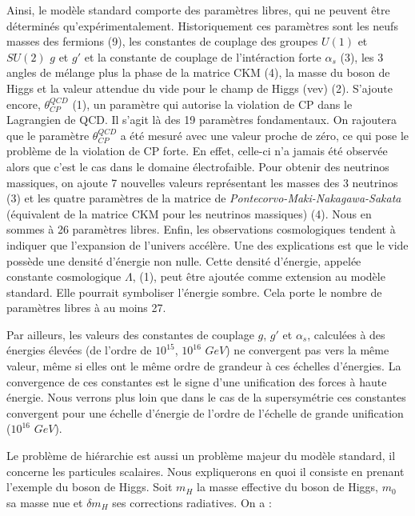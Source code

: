   Ainsi, le mod\`ele standard comporte des param\`etres libres, qui ne peuvent \^etre d\'etermin\'es qu'exp\'erimentalement. Historiquement ces param\`etres sont les neufs masses des fermions (9), les constantes de couplage des groupes $U(1)$ et $SU(2)$ $g$ et $g'$ et la constante de couplage de l'int\'eraction forte $\alpha_s$ (3), les 3 angles de m\'elange plus la phase de la matrice CKM (4), la masse du boson de Higgs et la valeur attendue du vide pour le champ de Higgs (vev) (2). S'ajoute encore, $\theta_{CP}^{QCD}$ (1), un param\`etre qui autorise la violation de CP dans le Lagrangien de QCD. Il s'agit l\`a des 19 param\`etres fondamentaux. On rajoutera que le param\`etre $\theta_{CP}^{QCD}$ a \'et\'e mesur\'e avec une valeur proche de z\'ero, ce qui pose le probl\`eme de la violation de CP forte. En effet, celle-ci n'a jamais \'et\'e observ\'ee alors que c'est le cas dans le domaine \'electrofaible. Pour obtenir des neutrinos massiques, on ajoute 7 nouvelles valeurs repr\'esentant les masses des 3 neutrinos (3) et les quatre param\`etres de la matrice de \textit{Pontecorvo-Maki-Nakagawa-Sakata} (équivalent de la matrice CKM pour les neutrinos massiques) (4). Nous en sommes \`a 26 param\`etres libres. Enfin, les observations cosmologiques tendent \`a indiquer que l'expansion de l'univers acc\'el\`ere. Une des explications est que le vide poss\`ede une densit\'e d'\'energie non nulle. Cette densit\'e d'\'energie, appel\'ee constante cosmologique $\Lambda$, (1), peut \^etre ajout\'ee comme extension au mod\`ele standard. Elle pourrait symboliser l'énergie sombre. Cela porte le nombre de param\`etres libres \`a au moins 27. 
  
  \medskip

  Par ailleurs, les valeurs des constantes de couplage $g$, $g'$ et $\alpha_s$, calcul\'ees \`a des \'energies \'elev\'ees (de l'ordre de $10^{15}$, $10^{16}$ $GeV$) ne convergent pas vers la m\^eme valeur, m\^eme si elles ont le m\^eme ordre de grandeur \`a ces \'echelles d'\'energies. La convergence de ces constantes est le signe d'une unification des forces \`a haute \'energie. Nous verrons plus loin que dans le cas de la supersymétrie ces constantes convergent pour une \'echelle d'\'energie de l'ordre de l'\'echelle de grande unification ($10^{16}$ $GeV$).

  \medskip
  
  Le probl\`eme de hiérarchie est aussi un probl\`eme majeur du mod\`ele standard, il concerne les particules scalaires. Nous expliquerons en quoi il consiste en prenant l'exemple du boson de Higgs. Soit $m_H$ la masse effective du boson de Higgs, $m_0$ sa masse nue et $\delta m_H$ ses corrections radiatives. On a :
  
